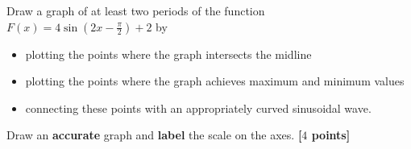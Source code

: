 \newpage

\begin{problem}
  Draw a graph of at least two periods of the function $F(x) = 4\sin
  \left(2x - \frac{\pi}{2}\right) + 2$ by
  \begin{itemize}
    \item plotting the points where the graph intersects the midline
    \item plotting the points where the graph achieves maximum and minimum
      values
    \item connecting these points with an appropriately curved sinusoidal wave.
  \end{itemize}
  Draw an \textbf{accurate} graph and \textbf{label} the scale on the axes.
  \textbf{[$4$ points]}
\end{problem}

\begin{solution}
  \begin{figure}[H]
    \centering


    \caption{}
  \end{figure}
\end{solution}
